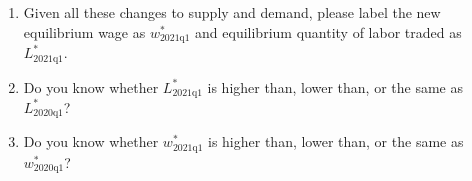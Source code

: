 \documentclass{assignment}
\begin{document}
\begin{enumerate}
\item Given all these changes to supply and demand, please label the new equilibrium wage as $w^*_\text{2021q1}$ and equilibrium quantity of labor traded as $L^*_\text{2021q1}$.

\item Do you know whether $L^*_\text{2021q1}$ is higher than, lower than, or the same as $L^*_\text{2020q1}$?

\vfill

\item Do you know whether $w^*_\text{2021q1}$ is higher than, lower than, or the same as $w^*_\text{2020q1}$?

\vfill

\end{enumerate}
\end{document}
